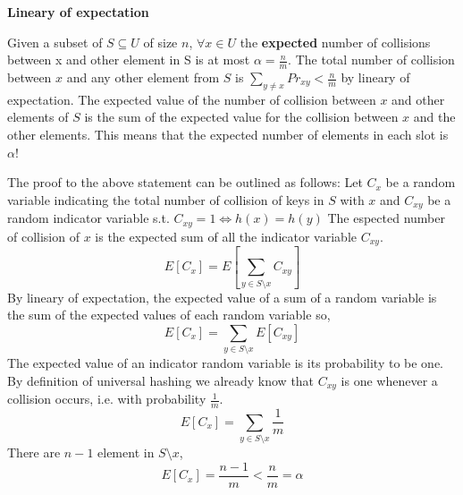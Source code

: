 \begin{framed}
\textbf{Lineary of expectation} \hfill \\

\end{framed}
Given a subset of $S \subseteq U$ of size $n$, $\forall x \in U$ the \textbf{expected} number of collisions between x and other element in S is at most $\alpha = \frac{n}{m}$. The total number of collision between $x$ and any other element from $S$ is $\sum_{y\neq x} Pr_{xy} < \frac{n}{m}$ by lineary of expectation. The expected value of the number of collision between $x$ and other elements of $S$ is the sum of the expected value for the collision between $x$ and the other elements.  This means that the expected number of elements in each slot is $\alpha$!

The proof to the above statement can be outlined as follows:
Let $C_x$ be a random variable indicating the total number of collision of keys in $S$ with $x$ and $C_{xy}$ be a random indicator variable  s.t. $C_{xy}=1 \Longleftrightarrow h(x)=h(y)$
The espected number of collision of $x$ is the expected sum of all the indicator variable $C_{xy}$.
\[
E[C_x] = E[\sum_{y\in S \setminus x} C_{xy}]
\]
By lineary of expectation, the expected value of a sum of a random variable is the sum of the expected values of each random variable so,
\[
E[C_x] = \sum_{y\in S \setminus x} E[C_{xy}]
\]
The expected value of an indicator random variable is its probability to be one. By definition of universal hashing we already know that $C_{xy}$ is one whenever a collision occurs, i.e. with probability $\frac{1}{m}$. 
\[
E[C_x] = \sum_{y\in S \setminus x} \frac{1}{m}
\]
There are $n-1$ element in $S \setminus x$,
\[
E[C_x] = \frac{n-1}{m} < \frac{n}{m}=\alpha
\]